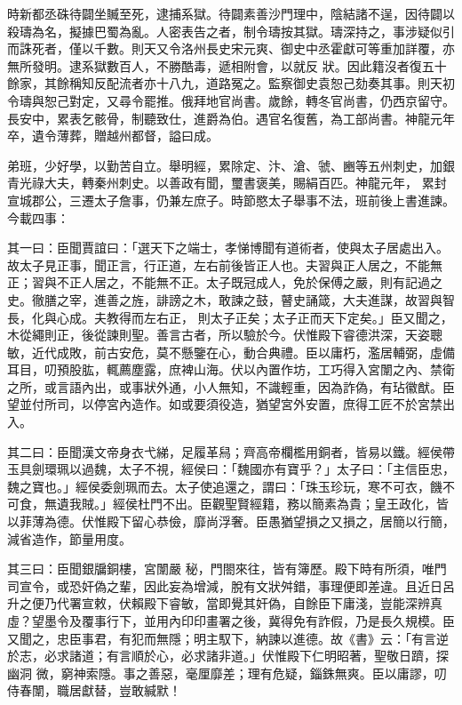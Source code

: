 \begin{pinyinscope}
 時新都丞硃待闢坐贓至死，逮捕系獄。待闢素善沙門理中，陰結諸不逞，因待闢以殺璹為名，擬據巴蜀為亂。人密表告之者，制令璹按其獄。璹深持之，事涉疑似引而誅死者，僅以千數。則天又令洛州長史宋元爽、御史中丞霍獻可等重加詳覆，亦無所發明。逮系獄數百人，不勝酷毒，遞相附會，以就反
 狀。因此籍沒者復五十餘家，其餘稱知反配流者亦十八九，道路冤之。監察御史袁恕己劾奏其事。則天初令璹與恕己對定，又尋令罷推。俄拜地官尚書。歲餘，轉冬官尚書，仍西京留守。長安中，累表乞骸骨，制聽致仕，進爵為伯。遇官名復舊，為工部尚書。神龍元年卒，遺令薄葬，贈越州都督，謚曰成。



 弟班，少好學，以勤苦自立。舉明經，累除定、汴、滄、虢、豳等五州刺史，加銀青光祿大夫，轉秦州刺史。以善政有聞，璽書褒美，賜絹百匹。神龍元年，
 累封宣城郡公，三遷太子詹事，仍兼左庶子。時節愍太子舉事不法，班前後上書進諫。今載四事：



 其一曰：臣聞賈誼曰：「選天下之端士，孝悌博聞有道術者，使與太子居處出入。故太子見正事，聞正言，行正道，左右前後皆正人也。夫習與正人居之，不能無正；習與不正人居之，不能無不正。太子既冠成人，免於保傅之嚴，則有記過之史。徹膳之宰，進善之旌，誹謗之木，敢諫之鼓，瞽史誦箴，大夫進謀，故習與智長，化與心成。夫教得而左右正，
 則太子正矣；太子正而天下定矣。」臣又聞之，木從繩則正，後從諫則聖。善言古者，所以驗於今。伏惟殿下睿德洪深，天姿聰敏，近代成敗，前古安危，莫不懸鑒在心，動合典禮。臣以庸朽，濫居輔弼，虛備耳目，叨預股肱，輒薦塵露，庶裨山海。伏以內置作坊，工巧得入宮闈之內、禁衛之所，或言語內出，或事狀外通，小人無知，不識輕重，因為詐偽，有玷徽猷。臣望並付所司，以停宮內造作。如或要須役造，猶望宮外安置，庶得工匠不於宮禁出入。



 其二曰：臣聞漢文帝身衣弋綈，足履革舄；齊高帝欄檻用銅者，皆易以鐵。經侯帶玉具劍環珮以過魏，太子不視，經侯曰：「魏國亦有寶乎？」太子曰：「主信臣忠，魏之寶也。」經侯委劍珮而去。太子使追還之，謂曰：「珠玉珍玩，寒不可衣，饑不可食，無遺我賊。」經侯杜門不出。臣觀聖賢經籍，務以簡素為貴；皇王政化，皆以菲薄為德。伏惟殿下留心恭儉，靡尚浮奢。臣愚猶望損之又損之，居簡以行簡，減省造作，節量用度。



 其三曰：臣聞銀牖銅樓，宮闈嚴
 秘，門閤來往，皆有簿歷。殿下時有所須，唯門司宣令，或恐奸偽之輩，因此妄為增減，脫有文狀舛錯，事理便即差違。且近日呂升之便乃代署宣敕，伏賴殿下睿敏，當即覺其奸偽，自餘臣下庸淺，豈能深辨真虛？望墨令及覆事行下，並用內印印畫署之後，冀得免有詐假，乃是長久規模。臣又聞之，忠臣事君，有犯而無隱；明主馭下，納諫以進德。故《書》云：「有言逆於志，必求諸道；有言順於心，必求諸非道。」伏惟殿下仁明昭著，聖敬日躋，探幽洞
 微，窮神索隱。事之善惡，毫厘靡差；理有危疑，錙銖無爽。臣以庸謬，叨侍春闈，職居獻替，豈敢緘默！




\end{pinyinscope}
